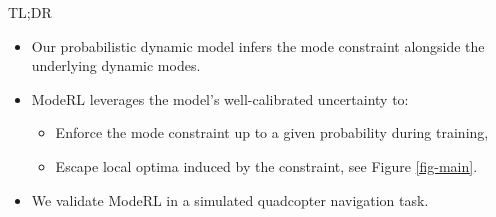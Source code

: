 \documentclass[final,11pt]{beamer}
\newlength{\colwidth}
\begin{document}
\begin{frame}[t]
\begin{columns}[t]
\begin{column}{\colwidth}
\begin{alertblock}{TL;DR}
\begin{itemize}
    \item Our probabilistic dynamic model infers the mode constraint alongside the underlying dynamic modes.
    \item \alert{ModeRL} leverages the model’s well-calibrated uncertainty to:
        \begin{itemize}
            \item Enforce the mode constraint up to a given probability \alert{during training},
            \item Escape local optima induced by the constraint, see Figure \ref{fig-main}.
        \end{itemize}
    \item We validate \alert{ModeRL} in a simulated quadcopter navigation task.
   \end{itemize}


\end{alertblock}
\end{column}
\end{columns}
\end{frame}
\end{document}
